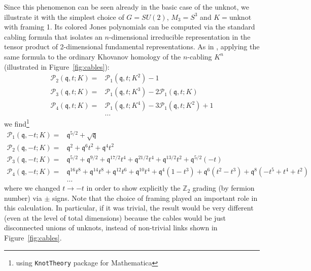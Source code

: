 \documentclass[hyper,letterpaper]{JHEP3}
\newcommand{\Z}{{\mathbb Z}}
\def\frak{\mathfrak}
\def\CP{{\mathcal P}}
\newcommand{\fq}{{\frak q}}
\begin{document}
{Since this phenomenon can be seen already in the basic case of the unknot, we illustrate it with the simplest choice
of $G=SU(2)$, $M_3 = S^3$ and $K = \text{unknot}$ with framing 1.
Its colored Jones polynomials can be computed via the standard cabling formula
that isolates an $n$-dimensional irreducible representation in the tensor product of 2-dimensional fundamental representations.
As in \cite{khovanov2005categorifications},
applying the same formula to the ordinary Khovanov homology of the $n$-cabling $K^n$ (illustrated in Figure~\ref{fig:cables}):
\begin{equation}
	 \begin{array}{rl}
	 \CP_2(\fq,t;K)=&\CP_{1}(\fq,t;K^2)-1 \\
	 \CP_3(\fq,t;K)=&\CP_{1}(\fq,t;K^3)-2\CP_1(\fq,t;K) \\
	 \CP_4(\fq,t;K)=&\CP_{1}(\fq,t;K^4)-3\CP_{1}(\fq,t;K^2)+1 \\
	 &\ldots
	 \end{array}
\label{cablingfla}
\end{equation}
we find\footnote{using \texttt{KnotTheory} package for Mathematica}
\begin{equation}
	 \begin{array}{rl}
     \CP_1(\fq,-t;K)=&\mathfrak{q}^{5/2}+\sqrt{\mathfrak{q}} \\
	 \CP_2(\fq,-t;K)=&\mathfrak{q}^2+\mathfrak{q}^6 t^2+\mathfrak{q}^4 t^2  \\ \CP_3(\fq,-t;K)=&\mathfrak{q}^{5/2}+\mathfrak{q}^{9/2}+\mathfrak{q}^{17/2} t^4+\mathfrak{q}^{21/2} t^4+\mathfrak{q}^{13/2} t^2+\mathfrak{q}^{5/2} (-t) \\
	 \CP_4(\fq,-t;K)=&\mathfrak{q}^{16} t^8+\mathfrak{q}^{14} t^8+\mathfrak{q}^{12} t^6+\mathfrak{q}^{10} t^4+\mathfrak{q}^4 \left(1-t^3\right)+\mathfrak{q}^6 \left(t^2-t^3\right)+\mathfrak{q}^8 \left(-t^5+t^4+t^2\right) \\
	 &\ldots
	 \end{array}
	 \label{cabled-unknot-Kh}
\end{equation}
where we changed $t\rightarrow -t$ in order to show explicitly the $\Z_2$ grading (by fermion number) via $\pm$ signs.
Note that the choice of framing played an important role in this calculation.
In particular, if it was trivial, the result would be very different (even at the level of total dimensions)
because the cables would be just disconnected unions of unknots, instead of non-trivial links shown in Figure~\ref{fig:cables}.

}
\end{document}
